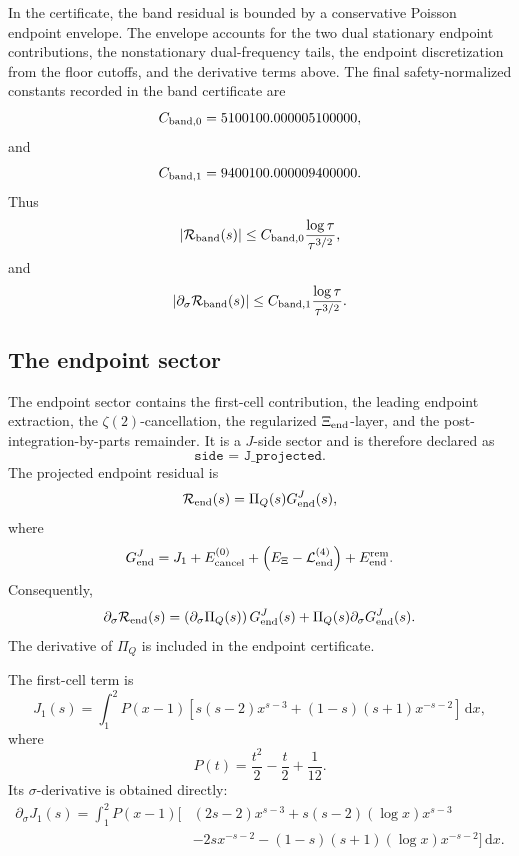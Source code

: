 \documentclass[11pt]{article}
\newcommand{\dd}{\mathrm{d}}
\newcommand{\s}{s}
\newcommand{\sig}{\sigma}
\newcommand{\tauh}{\tau}
\newcommand{\Rband}{\mathcal R_{\rm band}}
\newcommand{\Rend}{\mathcal R_{\rm end}}
\newcommand{\PiQ}{\Pi_Q}
\newcommand{\JSON}[1]{\texttt{#1}}
\begin{document}
In the certificate, the band residual is bounded by a conservative Poisson
endpoint envelope.  The envelope accounts for the two dual stationary endpoint
contributions, the nonstationary dual-frequency tails, the endpoint
discretization from the floor cutoffs, and the derivative terms above.  The
final safety-normalized constants recorded in the band certificate are
\[
        C_{{\rm band},0}
        =
        5100100.000005100000,
\]
and
\[
        C_{{\rm band},1}
        =
        9400100.000009400000.
\]
Thus
\[
        |\Rband(\s)|
        \le
        C_{{\rm band},0}
        \frac{\log\tauh}{\tauh^{3/2}},
\]
and
\[
        |\partial_\sig\Rband(\s)|
        \le
        C_{{\rm band},1}
        \frac{\log\tauh}{\tauh^{3/2}}.
\]

\subsection{The endpoint sector}

The endpoint sector contains the first-cell contribution, the leading endpoint
extraction, the \(\zeta(2)\)-cancellation, the regularized
\(\Xi_{\rm end}\)-layer, and the post-integration-by-parts remainder.  It is a
\(J\)-side sector and is therefore declared as
\[
        \JSON{side = J\_projected}.
\]
The projected endpoint residual is
\[
        \Rend(\s)
        =
        \PiQ(\s)G_{\rm end}^{J}(\s),
\]
where
\[
        G_{\rm end}^{J}
        =
        J_1
        +
        E_{\rm cancel}^{(0)}
        +
        \left(E_\Xi-\mathcal L_{\rm end}^{(4)}\right)
        +
        E_{\rm end}^{\rm rem}.
\]
Consequently,
\[
        \partial_\sig\Rend(\s)
        =
        \left(\partial_\sig\PiQ(\s)\right)G_{\rm end}^{J}(\s)
        +
        \PiQ(\s)\partial_\sig G_{\rm end}^{J}(\s).
\]
The derivative of \(\PiQ\) is included in the endpoint certificate.

The first-cell term is
\[
        J_1(\s)
        =
        \int_1^2
        P(x-1)
        \left[
            \s(\s-2)x^{\s-3}
            +
            (1-\s)(\s+1)x^{-\s-2}
        \right]
        \,\dd x,
\]
where
\[
        P(t)=\frac{t^2}{2}-\frac{t}{2}+\frac{1}{12}.
\]
Its \(\sig\)-derivative is obtained directly:
\[
\begin{aligned}
        \partial_\sig J_1(\s)
        =
        \int_1^2
        P(x-1)
        \big[
            &(2\s-2)x^{\s-3}
            +
            \s(\s-2)(\log x)x^{\s-3}
            \\
            &-
            2\s x^{-\s-2}
            -
            (1-\s)(\s+1)(\log x)x^{-\s-2}
        \big]
        \,\dd x.
\end{aligned}
\]
\end{document}
